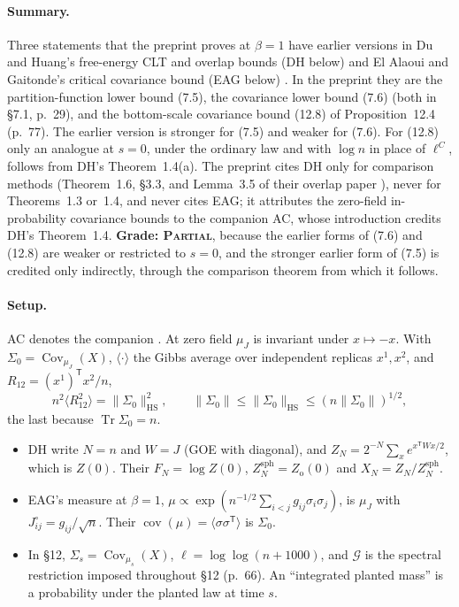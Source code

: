 \documentclass[11pt]{article}
\DeclareMathOperator{\Cov}{Cov}
\DeclareMathOperator{\Tr}{Tr}
\newcommand{\norm}[1]{\lVert #1\rVert}
\newcommand{\ploc}[2]{#1}
\newcommand{\sloc}[2]{\cite[#2]{#1}}
\newcommand{\grade}[1]{\textsc{#1}}
\begin{document}
\paragraph{Summary.}
Three statements that the preprint proves at $\beta=1$ have earlier versions
in Du and Huang's free-energy CLT and overlap bounds (DH below)
\sloc{DuHuang2026-CriticalSKFreeEnergyFluctuations}{Thms~1.3--1.4, p.~3} and
El Alaoui and Gaitonde's critical covariance bound (EAG below)
\sloc{ElAlaouiGaitonde2022-CovarianceMatrixSK}{Prop.~4.5, p.~11}. In the
preprint they are the partition-function lower bound
\ploc{(7.5)}{profile-spectral.tex:1341--1347}, the covariance lower bound
\ploc{(7.6)}{profile-spectral.tex:1349--1367} (both in
\ploc{\S7.1, p.~29}{profile-spectral.tex:1330--1367}), and the bottom-scale
covariance bound \ploc{(12.8)}{profile-amplification.tex:943--948} of
\ploc{Proposition~12.4 (p.~77)}{profile-amplification.tex:938--949}. The
earlier version is stronger for (7.5) and weaker for (7.6). For (12.8) only an
analogue at $s=0$, under the ordinary law and with $\log n$ in place of
$\ell^C$, follows from DH's Theorem~1.4(a). The preprint cites DH only for
comparison methods (Theorem~1.6, \S3.3, and Lemma~3.5 of their overlap paper
\cite{DuHuang2026-CriticalSKOverlapDistribution}), never for Theorems~1.3 or~1.4, and never cites EAG; it attributes the
zero-field in-probability covariance bounds to the companion AC, whose
introduction credits DH's Theorem~1.4. \textbf{Grade: \grade{Partial}}, because
the earlier forms of (7.6) and (12.8) are weaker or restricted to $s=0$, and
the stronger earlier form of (7.5) is credited only indirectly, through the
comparison theorem from which it follows.

\paragraph{Setup.}
AC denotes the companion \cite{OAI-AcceptedCritical}. At zero field $\mu_J$ is
invariant under $x\mapsto-x$. With $\Sigma_0=\Cov_{\mu_J}(X)$, $\langle\cdot\rangle$
the Gibbs average over independent replicas $x^1,x^2$, and
$R_{12}=(x^1)^{\mathsf T}x^2/n$,
\[
 n^2\langle R_{12}^2\rangle=\norm{\Sigma_0}_{\mathrm{HS}}^2,\qquad
 \norm{\Sigma_0}\le\norm{\Sigma_0}_{\mathrm{HS}}\le(n\norm{\Sigma_0})^{1/2},
\]
the last because $\Tr\Sigma_0=n$.
\begin{itemize}
\item DH write $N=n$ and $W=J$ (GOE with diagonal), and
 $Z_N=2^{-N}\sum_xe^{x^{\mathsf T}Wx/2}$, which is $Z(0)$. Their
 $F_N=\log Z(0)$, $Z_N^{\mathrm{sph}}=Z_{\mathrm o}(0)$ and
 $X_N=Z_N/Z_N^{\mathrm{sph}}$.
\item EAG's measure at $\beta=1$,
 $\mu\propto\exp(n^{-1/2}\sum_{i<j}g_{ij}\sigma_i\sigma_j)$, is $\mu_J$ with
 $J^\circ_{ij}=g_{ij}/\sqrt n$. Their $\operatorname{cov}(\mu)=\langle\sigma\sigma^{\mathsf T}\rangle$
 is $\Sigma_0$.
\item In \S12, $\Sigma_s=\Cov_{\mu_s}(X)$, $\ell=\log\log(n+1000)$, and
 $\mathcal G$ is the spectral restriction imposed throughout
 \ploc{\S12 (p.~66)}{profile-amplification.tex:9--13}. An ``integrated planted
 mass'' is a probability under the planted law at time $s$.
\end{itemize}
\end{document}
